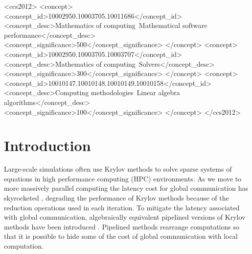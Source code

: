 \documentclass[sigconf]{acmart}
\begin{document}
%
%
\begin{CCSXML}
<ccs2012>
<concept>
<concept_id>10002950.10003705.10011686</concept_id>
<concept_desc>Mathematics of computing~Mathematical software performance</concept_desc>
<concept_significance>500</concept_significance>
</concept>
<concept>
<concept_id>10002950.10003705.10003707</concept_id>
<concept_desc>Mathematics of computing~Solvers</concept_desc>
<concept_significance>300</concept_significance>
</concept>
<concept>
<concept_id>10010147.10010148.10010149.10010158</concept_id>
<concept_desc>Computing methodologies~Linear algebra algorithms</concept_desc>
<concept_significance>100</concept_significance>
</concept>
</ccs2012>
\end{CCSXML}


%

\maketitle

\section{Introduction}


Large-scale simulations often use Krylov methods \cite{saad96iterative,VanDerVorst2003} to solve sparse systems of equations in high performance computing (HPC) environments. 
As we move to more massively parallel computing the latency cost for global communication has skyrocketed \cite{HPCChallenge}, degrading the performance of Krylov methods because of the reduction operations used in each iteration.
To mitigate the latency associated with global communication, algebraically equivalent pipelined versions of Krylov methods have been introduced 
\cite{Chronopoulos_Gear_1989, GhyselsAshbyMeerbergenVanroose2013, GhyselsVanroose2014, StrzodkaGoddeke06, Sturler_Vorst_1995, JacquesNicolasVollaire12}. 
Pipelined methods rearrange computations so that it is possible to hide some of the cost of global communication with local computation. 
\end{document}

